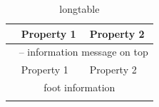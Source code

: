 \begin{center}%
    \begin{longtable}{l|l|l} %
        \hline  %
        \hline

        & Property 1 & Property 2\\ %
        \endfirsthead        %
        \hline
        
        \multicolumn{3}{c}{\tablename\ \thetable{} -- information message on top}\\
        \hline
        & Property 1 & Property 2\\
        \hline
        \endhead

        \hline
        \multicolumn{3}{c}{foot information}\\ \hline
        \endfoot

        \hline \hline
        \caption{longtable}
        \label{long_table}
        \endlastfoot




\end{longtable}
\end{center}
